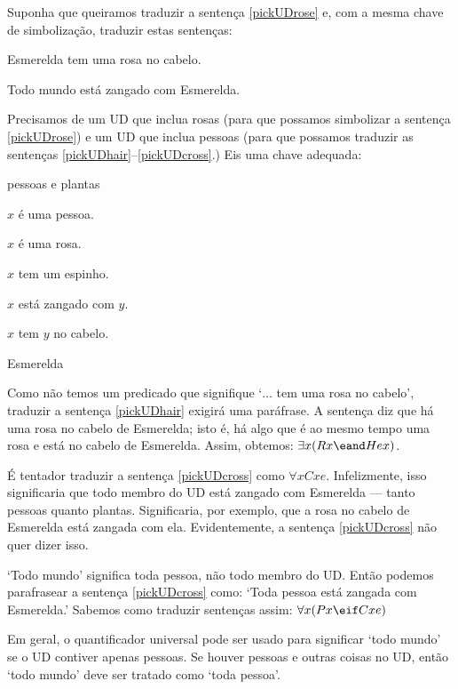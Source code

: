 Suponha que queiramos traduzir a sentença \ref{pickUDrose} e, com a mesma chave de simbolização, traduzir estas sentenças:

\begin{earg}
\item[\ex{pickUDhair}] Esmerelda tem uma rosa no cabelo.
\item[\ex{pickUDcross}] Todo mundo está zangado com Esmerelda.
\end{earg}

Precisamos de um UD que inclua rosas (para que possamos simbolizar a sentença \ref{pickUDrose}) e um UD que inclua pessoas (para que possamos traduzir as sentenças \ref{pickUDhair}--\ref{pickUDcross}.) Eis uma chave adequada:
\begin{ekey}
\item[UD:] pessoas e plantas
\item[Px:] $x$ é uma pessoa.
\item[Rx:] $x$ é uma rosa.
\item[Tx:] $x$ tem um espinho.
\item[Cxy:] $x$ está zangado com $y$.
\item[Hxy:] $x$ tem $y$ no cabelo.
\item[e:] Esmerelda
\end{ekey}

Como não temos um predicado que signifique `$\ldots$ tem uma rosa no cabelo', traduzir a sentença \ref{pickUDhair} exigirá uma paráfrase. A sentença diz que há uma rosa no cabelo de Esmerelda; isto é, há algo que é ao mesmo tempo uma rosa e está no cabelo de Esmerelda. Assim, obtemos: $\exists x(Rx \eand Hex)$.

É tentador traduzir a sentença \ref{pickUDcross} como $\forall x Cxe$. Infelizmente, isso significaria que todo membro do UD está zangado com Esmerelda — tanto pessoas quanto plantas. Significaria, por exemplo, que a rosa no cabelo de Esmerelda está zangada com ela. Evidentemente, a sentença \ref{pickUDcross} não quer dizer isso.

`Todo mundo' significa toda pessoa, não todo membro do UD. Então podemos parafrasear a sentença \ref{pickUDcross} como: `Toda pessoa está zangada com Esmerelda.' Sabemos como traduzir sentenças assim: $\forall x(Px \eif Cxe)$

Em geral, o quantificador universal pode ser usado para significar `todo mundo' se o UD contiver apenas pessoas. Se houver pessoas e outras coisas no UD, então `todo mundo' deve ser tratado como `toda pessoa'.


